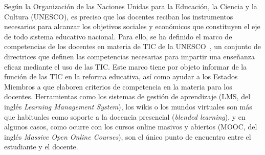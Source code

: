 Según la Organización de las Naciones Unidas para la Educación, la Ciencia y la Cultura (UNESCO), es preciso que los docentes reciban los instrumentos necesarios para alcanzar los objetivos sociales y económicos que constituyen el eje de todo sistema educativo nacional. Para ello, se ha definido el marco de competencias de los docentes en materia de TIC de la UNESCO~\cite{midoro2013guidelines}, un conjunto de directrices que definen las competencias necesarias para impartir una enseñanza eficaz mediante el uso de las TIC. Este marco tiene por objeto informar de la función de las TIC en la reforma educativa, así como ayudar a los Estados Miembros a que elaboren criterios de competencia en la materia para los docentes. Herramientas como los sistemas de gestión de aprendizaje (LMS, del inglés \emph{Learning Management System}), los wikis o los mundos virtuales son más que habituales como soporte a la docencia presencial (\emph{blended learning}), y en algunos casos, como ocurre con los cursos online masivos y abiertos (MOOC, del inglés \emph{Massive Open Online Courses}), son el único punto de encuentro entre el estudiante y el docente. 

